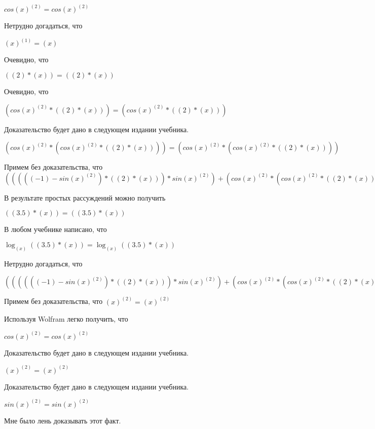 \documentclass[12pt,a4paper,fleqn]{article}
\theoremstyle{definition}
\begin{document}
$cos{( x )}^{( 2 )} = cos{( x )}^{( 2 )}$

Нетрудно догадаться, что

${( x )}^{( 1 )} = ( x )$

Очевидно, что

$(( 2 ) * ( x )) = (( 2 ) * ( x ))$

Очевидно, что

$(cos{( x )}^{( 2 )} * (( 2 ) * ( x ))) = (cos{( x )}^{( 2 )} * (( 2 ) * ( x )))$

Доказательство будет дано в следующем издании учебника.

$(cos{( x )}^{( 2 )} * (cos{( x )}^{( 2 )} * (( 2 ) * ( x )))) = (cos{( x )}^{( 2 )} * (cos{( x )}^{( 2 )} * (( 2 ) * ( x ))))$

Примем без доказательства, что
$((((( -1 ) - sin{( x )}^{( 2 )}) * (( 2 ) * ( x ))) * sin{( x )}^{( 2 )}) + (cos{( x )}^{( 2 )} * (cos{( x )}^{( 2 )} * (( 2 ) * ( x ))))) = ((((( -1 ) - sin{( x )}^{( 2 )}) * (( 2 ) * ( x ))) * sin{( x )}^{( 2 )}) + (cos{( x )}^{( 2 )} * (cos{( x )}^{( 2 )} * (( 2 ) * ( x )))))$

В результате простых рассуждений можно получить

$(( 3.5 ) * ( x )) = (( 3.5 ) * ( x ))$

В любом учебнике написано, что

$\log_{( x )}{(( 3.5 ) * ( x ))} = \log_{( x )}{(( 3.5 ) * ( x ))}$

Нетрудно догадаться, что

$(((((( -1 ) - sin{( x )}^{( 2 )}) * (( 2 ) * ( x ))) * sin{( x )}^{( 2 )}) + (cos{( x )}^{( 2 )} * (cos{( x )}^{( 2 )} * (( 2 ) * ( x ))))) * \log_{( x )}{(( 3.5 ) * ( x ))}) = (((((( -1 ) - sin{( x )}^{( 2 )}) * (( 2 ) * ( x ))) * sin{( x )}^{( 2 )}) + (cos{( x )}^{( 2 )} * (cos{( x )}^{( 2 )} * (( 2 ) * ( x ))))) * \log_{( x )}{(( 3.5 ) * ( x ))})$

Примем без доказательства, что
${( x )}^{( 2 )} = {( x )}^{( 2 )}$

Используя Wolfram легко получить, что

$cos{( x )}^{( 2 )} = cos{( x )}^{( 2 )}$

Доказательство будет дано в следующем издании учебника.

${( x )}^{( 2 )} = {( x )}^{( 2 )}$

Доказательство будет дано в следующем издании учебника.

$sin{( x )}^{( 2 )} = sin{( x )}^{( 2 )}$

Мне было лень доказывать этот факт.
\end{document}
